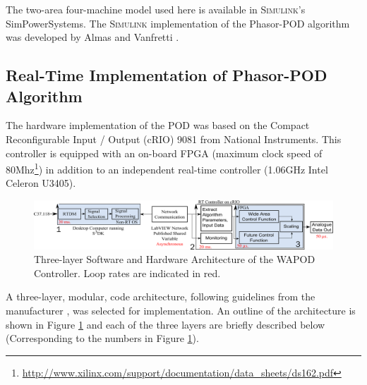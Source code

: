 \documentclass[journal]{IEEEtran}
\begin{document}
The two-area four-machine model used here is available in \textsc{Simulink}'s SimPowerSystems. The \textsc{Simulink} implementation of the Phasor-POD algorithm was developed by Almas and Vanfretti \cite{PhasorPODImplement}. \\

\subsection{Real-Time Implementation of Phasor-POD Algorithm}


The hardware implementation of the POD was based on the Compact Reconfigurable Input / Output (cRIO) 9081 \cite{cRIO9081} from National Instruments. This controller is equipped with an on-board FPGA (maximum clock speed of 80Mhz\footnote{\url{http://www.xilinx.com/support/documentation/data_sheets/ds162.pdf}}) in addition to an independent real-time controller (1.06GHz Intel Celeron U3405). 
\begin{figure}[!t]
\centering
\includegraphics[width=6in]{Final_RT_Arch.png} 
\caption{Three-layer Software and Hardware Architecture of the WAPOD Controller. Loop rates are indicated in red.} %
\label{RTArchitecture}
\end{figure}

A three-layer, modular, code architecture, following guidelines from the manufacturer \cite{LabviewTemplate}, was selected for implementation. An outline of the architecture is shown in Figure \ref{RTArchitecture} and each of the three layers are briefly described below (Corresponding to the numbers in Figure \ref{RTArchitecture}). 
\end{document}
